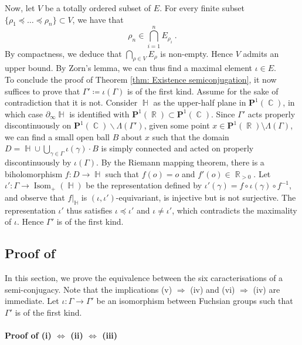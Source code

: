 \documentclass{amsart}
\theoremstyle{plain}
\theoremstyle{definition}
\DeclareMathOperator{\Isom}{Isom}
\DeclareMathOperator{\Cb}{\mathbb{C}}
\DeclareMathOperator{\Hb}{\mathbb{H}}
\DeclareMathOperator{\Rb}{{\mathbb{R}}}
\newcommand{\1}{\mathbf{1}}
\begin{document}
    Now, let $V$ be a totally ordered subset of $E$. For every finite subset $\{\rho_1\preceq \ldots \preceq \rho_n\} \subset V$, we have that
    \[\rho_n \in \bigcap_{i=1}^n E_{\rho_i}~.\]
    By compactness, we deduce that $\bigcap_{\rho \in V} E_\rho$
    is non-empty. Hence $V$ admits an upper bound. By Zorn's lemma, we can thus find a maximal element $\iota\in E$. \\
    
    To conclude the proof of Theorem \ref{thm: Existence semiconjugation}, it now suffices to prove that $\Gamma'\coloneqq \iota(\Gamma)$ is of the first kind. 
    Assume for the sake of contradiction that it is not. Consider $\Hb$ as the upper-half plane in $\mathbf P^1(\Cb)$, in which case $\partial_\infty \Hb$ is identified with $\mathbf P^1(\Rb)\subset\mathbf P^1(\Cb)$. Since $\Gamma'$ acts properly discontinuously on $\mathbf P^1(\Cb) \backslash \Lambda(\Gamma')$, given some point $x\in \mathbf P^1(\Rb) \setminus \Lambda(\Gamma)$, we can find a small open ball $B$ about $x$ such that the domain $D = \Hb \cup \bigcup_{\gamma \in \Gamma} \iota(\gamma) \cdot B$ is simply connected and acted on properly discontinuously by $\iota(\Gamma)$. By the Riemann mapping theorem, there is a biholomorphism $f\colon D\to \Hb$ such that $f(o)=o$ and $f'(o)\in\Rb_{>0}$. Let $\iota'\colon\Gamma\to\Isom_+(\Hb)$ be the representation defined by $\iota'(\gamma)=f\circ \iota(\gamma)\circ f^{-1}$, and observe that $f|_{\Hb}$ is $(\iota,\iota')$-equivariant, is injective but is not surjective. The representation $\iota'$ thus satisfies $\iota \preceq \iota'$ and $\iota \neq \iota'$, which contradicts the maximality of $\iota$. Hence $\Gamma'$ is of the first kind.


\subsection{%
\texorpdfstring{%
Proof of }%
{Proof of Theorem A.1}}

In this section, we prove the equivalence between the six caracterisations of a semi-conjugacy. Note that the implications (v) $\Rightarrow$ (iv) and (vi) $\Rightarrow$ (iv) are immediate. Let $\iota\colon \Gamma \to \Gamma'$ be an isomorphism between Fuchsian groups such that $\Gamma'$ is of the first kind.\\

\paragraph{Proof of (i) $\Leftrightarrow$ (ii) $\Leftrightarrow$ (iii)}
\end{document}
